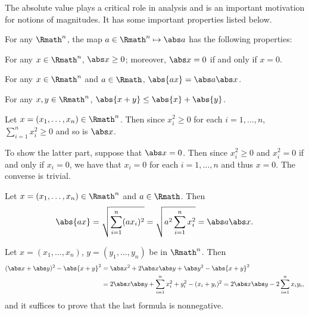The absolute value plays a critical role in analysis
and is an important motivation for notions of magnitudes.
It has some important properties listed below.

\begin{observation}
    \label{obv:absnorm}
    For any \(\Rmath^n\),
    the map \(a\in\Rmath^n\mapsto\abs a\) has the following properties:
    \begin{nlist}
        \item For any \(x\in\Rmath^n\), \(\abs x\ge 0\);
        moreover, \(\abs x=0\) if and only if \(x=0\).
        \item For any \(x\in\Rmath^n\) and \(a\in\Rmath\),
        \(\abs{ax}=\abs a\abs x\).
        \item For any \(x,y\in\Rmath^n\),
        \(\abs{x+y}\le\abs{x}+\abs{y}\).
    \end{nlist}
\end{observation}
\begin{myproof}
    \begin{nlist}
        \item Let \(x=(x_1,\dots,x_n)\in\Rmath^n\).
        Then since \(x_i^2\ge 0\) for each \(i=1,\dots,n\),
        \(\sum_{i=1}^{n}x_i^2\ge 0\) and so is \(\abs x\).

        To show the latter part,
        suppose that \(\abs x=0\).
        Then since \(x_i^2\ge 0\)
        and \(x_i^2=0\) if and only if \(x_i=0\),
        we have that \(x_i=0\) for each \(i=1,\dots,n\)
        and thus \(x=0\).
        The converse is trivial.
        
        \item Let \(x=(x_1,\dots,x_n)\in\Rmath^n\) and \(a\in\Rmath\).
        Then
        \[
            \abs{ax}
            =\sqrt{\sum_{i=1}^{n}(ax_i)^2}
            =\sqrt{a^2\sum_{i=1}^{n}x_i^2}
            =\abs a\abs x.
        \]

        \item Let \(x=(x_1,\dots,x_n)\), \(y=(y_1,\dots,y_n)\)
        be in \(\Rmath^n\).
        Then
        \begin{align*}
            (\abs x+\abs y)^2-\abs{x+y}^2
            &=\abs x^2+2\abs x\abs y+\abs y^2-\abs{x+y}^2 \\
            &=2\abs x\abs y+\sum_{i=1}^{n}x_i^2+y_i^2-(x_i+y_i)^2
            =2\abs x\abs y-2\sum_{i=1}^{n}x_iy_i,
        \end{align*}
        and it suffices to prove that
        the last formula is nonnegative.
        \rightqed
    \end{nlist}
\end{myproof}

